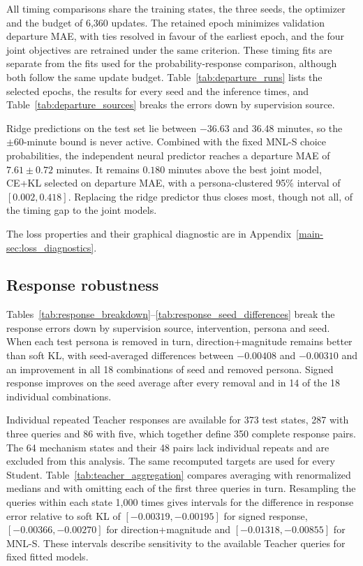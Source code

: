All timing comparisons share the training states, the three seeds, the optimizer and the budget of 6,360 updates. The retained epoch minimizes validation departure MAE, with ties resolved in favour of the earliest epoch, and the four joint objectives are retrained under the same criterion. These timing fits are separate from the fits used for the probability-response comparison, although both follow the same update budget. Table~\ref{tab:departure_runs} lists the selected epochs, the results for every seed and the inference times, and Table~\ref{tab:departure_sources} breaks the errors down by supervision source.


Ridge predictions on the test set lie between $-36.63$ and 36.48 minutes, so the $\pm60$-minute bound is never active. Combined with the fixed MNL-S choice probabilities, the independent neural predictor reaches a departure MAE of $7.61\pm0.72$ minutes. It remains $0.180$ minutes above the best joint model, CE+KL selected on departure MAE, with a persona-clustered 95\% interval of $[0.002,0.418]$. Replacing the ridge predictor thus closes most, though not all, of the timing gap to the joint models.

The loss properties and their graphical diagnostic are in Appendix~\ref{main-sec:loss_diagnostics}.

\subsection{Response robustness}
Tables~\ref{tab:response_breakdown}--\ref{tab:response_seed_differences} break the response errors down by supervision source, intervention, persona and seed. When each test persona is removed in turn, direction+magnitude remains better than soft KL, with seed-averaged differences between $-0.00408$ and $-0.00310$ and an improvement in all 18 combinations of seed and removed persona. Signed response improves on the seed average after every removal and in 14 of the 18 individual combinations.



Individual repeated Teacher responses are available for 373 test states, 287 with three queries and 86 with five, which together define 350 complete response pairs. The 64 mechanism states and their 48 pairs lack individual repeats and are excluded from this analysis. The same recomputed targets are used for every Student. Table~\ref{tab:teacher_aggregation} compares averaging with renormalized medians and with omitting each of the first three queries in turn. Resampling the queries within each state 1,000 times gives intervals for the difference in response error relative to soft KL of $[-0.00319,-0.00195]$ for signed response, $[-0.00366,-0.00270]$ for direction+magnitude and $[-0.01318,-0.00855]$ for MNL-S. These intervals describe sensitivity to the available Teacher queries for fixed fitted models.

\FloatBarrier
